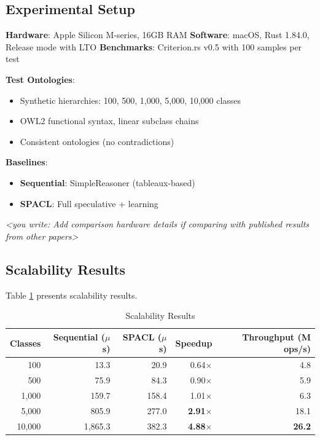 \documentclass[preprint,12pt]{elsarticle}
\begin{document}
\subsection{Experimental Setup}
\label{sec:setup}

\textbf{Hardware}: Apple Silicon M-series, 16GB RAM  
\textbf{Software}: macOS, Rust 1.84.0, Release mode with LTO  
\textbf{Benchmarks}: Criterion.rs v0.5 with 100 samples per test

\textbf{Test Ontologies}:
\begin{itemize}
    \item Synthetic hierarchies: 100, 500, 1,000, 5,000, 10,000 classes
    \item OWL2 functional syntax, linear subclass chains
    \item Consistent ontologies (no contradictions)
\end{itemize}

\textbf{Baselines}:
\begin{itemize}
    \item \textbf{Sequential}: SimpleReasoner (tableaux-based)
    \item \textbf{SPACL}: Full speculative + learning
\end{itemize}

\textit{<you write: Add comparison hardware details if comparing with published results from other papers>}

\subsection{Scalability Results}
\label{sec:scalability}

Table \ref{tab:scalability} presents scalability results.

\begin{table}[htbp]
\centering
\caption{Scalability Results}
\label{tab:scalability}
\begin{tabular}{r|r|r|r|r}
\toprule
\textbf{Classes} & \textbf{Sequential ($\mu$s)} & \textbf{SPACL ($\mu$s)} & \textbf{Speedup} & \textbf{Throughput (M ops/s)} \\
\midrule
100 & 13.3 & 20.9 & 0.64$\times$ & 4.8 \\
500 & 75.9 & 84.3 & 0.90$\times$ & 5.9 \\
1,000 & 159.7 & 158.4 & 1.01$\times$ & 6.3 \\
5,000 & 805.9 & 277.0 & \textbf{2.91$\times$} & 18.1 \\
10,000 & 1,865.3 & 382.3 & \textbf{4.88$\times$} & \textbf{26.2} \\
\bottomrule
\end{tabular}
\end{table}
\end{document}
